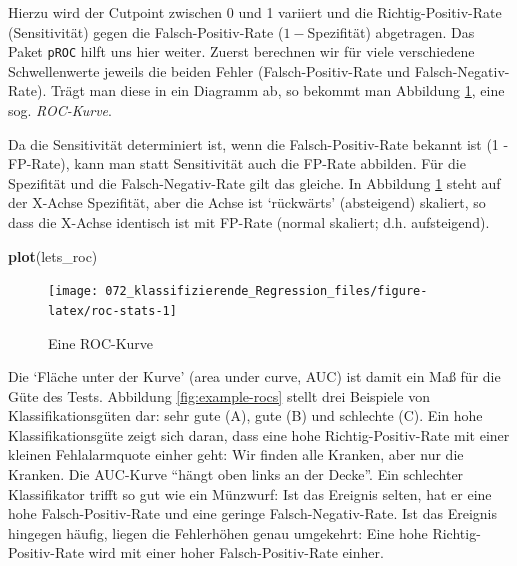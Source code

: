 \documentclass[12pt,ngerman,]{book}
\makeatletter
\newenvironment{Shaded}{\begin{snugshade}}{\end{snugshade}}
\newcommand{\KeywordTok}[1]{\textcolor[rgb]{0.13,0.29,0.53}{\textbf{#1}}}
\newcommand{\StringTok}[1]{\textcolor[rgb]{0.31,0.60,0.02}{#1}}
\newcommand{\OperatorTok}[1]{\textcolor[rgb]{0.81,0.36,0.00}{\textbf{#1}}}
\newcommand{\NormalTok}[1]{#1}
\newenvironment{kframe}{%
\medskip{}
\setlength{\fboxsep}{.8em}
 \def\at@end@of@kframe{}%
 \ifinner\ifhmode%
  \def\at@end@of@kframe{\end{minipage}}%
  \begin{minipage}{\columnwidth}%
 \fi\fi%
 \def\FrameCommand##1{\hskip\@totalleftmargin \hskip-\fboxsep
 \colorbox{shadecolor}{##1}\hskip-\fboxsep
     \hskip-\linewidth \hskip-\@totalleftmargin \hskip\columnwidth}%
 \MakeFramed {\advance\hsize-\width
   \@totalleftmargin\z@ \linewidth\hsize
   \@setminipage}}%
 {\par\unskip\endMakeFramed%
 \at@end@of@kframe}
\renewenvironment{Shaded}{\begin{kframe}}{\end{kframe}}
\theoremstyle{definition}
\theoremstyle{definition}
\theoremstyle{remark}
\makeatother
\begin{document}
Hierzu wird der Cutpoint zwischen 0 und 1 variiert und die
Richtig-Positiv-Rate (Sensitivität) gegen die Falsch-Positiv-Rate
(\(1-\)Spezifität) abgetragen. Das Paket \texttt{pROC} hilft uns hier
weiter. Zuerst berechnen wir für viele verschiedene Schwellenwerte
jeweils die beiden Fehler (Falsch-Positiv-Rate und Falsch-Negativ-Rate).
Trägt man diese in ein Diagramm ab, so bekommt man Abbildung
\ref{fig:roc-stats}, eine sog. \emph{ROC-Kurve}.

\begin{Shaded}
\end{Shaded}

Da die Sensitivität determiniert ist, wenn die Falsch-Positiv-Rate
bekannt ist (1 - FP-Rate), kann man statt Sensitivität auch die FP-Rate
abbilden. Für die Spezifität und die Falsch-Negativ-Rate gilt das
gleiche. In Abbildung \ref{fig:roc-stats} steht auf der X-Achse
Spezifität, aber die Achse ist `rückwärts' (absteigend) skaliert, so
dass die X-Achse identisch ist mit FP-Rate (normal skaliert; d.h.
aufsteigend).

\begin{Shaded}
\begin{Highlighting}[]
\KeywordTok{plot}\NormalTok{(lets_roc)}
\end{Highlighting}
\end{Shaded}

\begin{figure}

{\centering \texttt{[image: 072\_klassifizierende\_Regression\_files/figure-latex/roc-stats-1]} 

}

\caption{Eine ROC-Kurve}\label{fig:roc-stats}
\end{figure}

Die `Fläche unter der Kurve' (area under curve, AUC) ist damit ein Maß
für die Güte des Tests. Abbildung \ref{fig:example-rocs} stellt drei
Beispiele von Klassifikationsgüten dar: sehr gute (A), gute (B) und
schlechte (C). Ein hohe Klassifikationsgüte zeigt sich daran, dass eine
hohe Richtig-Positiv-Rate mit einer kleinen Fehlalarmquote einher geht:
Wir finden alle Kranken, aber nur die Kranken. Die AUC-Kurve ``hängt
oben links an der Decke''. Ein schlechter Klassifikator trifft so gut
wie ein Münzwurf: Ist das Ereignis selten, hat er eine hohe
Falsch-Positiv-Rate und eine geringe Falsch-Negativ-Rate. Ist das
Ereignis hingegen häufig, liegen die Fehlerhöhen genau umgekehrt: Eine
hohe Richtig-Positiv-Rate wird mit einer hoher Falsch-Positiv-Rate
einher.
\end{document}
